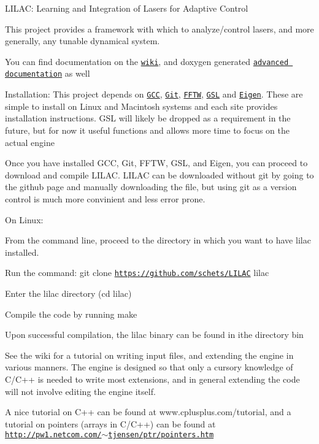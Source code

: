 L\-I\-L\-A\-C\-: Learning and Integration of Lasers for Adaptive Control

This project provides a framework with which to analyze/control lasers, and more generally, any tunable dynamical system.

You can find documentation on the \href{http://github.com/schets/LILAC/wiki}{\tt wiki}, and doxygen generated \href{http://schets.github.io/LILAC}{\tt advanced documentation} as well

Installation\-: This project depends on \href{gcc.gnu.org}{\tt G\-C\-C}, \href{git-scm.com}{\tt Git}, \href{www.fftw.org}{\tt F\-F\-T\-W}, \href{http://www.gnu.org/software/gsl/}{\tt G\-S\-L} and \href{eigen.tuxfamily.org}{\tt Eigen}. These are simple to install on Linux and Macintosh systems and each site provides installation instructions. G\-S\-L will likely be dropped as a requirement in the future, but for now it useful functions and allows more time to focus on the actual engine

Once you have installed G\-C\-C, Git, F\-F\-T\-W, G\-S\-L, and Eigen, you can proceed to download and compile L\-I\-L\-A\-C. L\-I\-L\-A\-C can be downloaded without git by going to the github page and manually downloading the file, but using git as a version control is much more convinient and less error prone.

On Linux\-:


\begin{DoxyEnumerate}
\item From the command line, proceed to the directory in which you want to have lilac installed.
\item Run the command\-: git clone \href{https://github.com/schets/LILAC}{\tt https\-://github.\-com/schets/\-L\-I\-L\-A\-C} lilac
\item Enter the lilac directory (cd lilac)
\item Compile the code by running make
\item Upon successful compilation, the lilac binary can be found in ithe directory bin
\end{DoxyEnumerate}

See the wiki for a tutorial on writing input files, and extending the engine in various manners. The engine is designed so that only a cursory knowledge of C/\-C++ is needed to write most extensions, and in general extending the code will not involve editing the engine itself.

A nice tutorial on C++ can be found at www.\-cplusplus.\-com/tutorial, and a tutorial on pointers (arrays in C/\-C++) can be found at \href{http://pw1.netcom.com/~tjensen/ptr/pointers.htm}{\tt http\-://pw1.\-netcom.\-com/$\sim$tjensen/ptr/pointers.\-htm} 